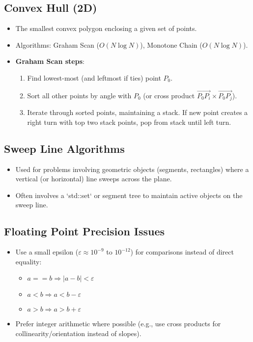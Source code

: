 \subsection*{Convex Hull (2D)}
\begin{itemize}
    \item The smallest convex polygon enclosing a given set of points.
    \item Algorithms: Graham Scan ($O(N \log N)$), Monotone Chain ($O(N \log N)$).
    \item \textbf{Graham Scan steps}:
        \begin{enumerate}
            \item Find lowest-most (and leftmost if ties) point $P_0$.
            \item Sort all other points by angle with $P_0$ (or cross product $\vec{P_0P_i} \times \vec{P_0P_j}$).
            \item Iterate through sorted points, maintaining a stack. If new point creates a right turn with top two stack points, pop from stack until left turn.
        \end{enumerate}
\end{itemize}

\subsection*{Sweep Line Algorithms}
\begin{itemize}
    \item Used for problems involving geometric objects (segments, rectangles) where a vertical (or horizontal) line sweeps across the plane.
    \item Often involves a `std::set` or segment tree to maintain active objects on the sweep line.
\end{itemize}

\subsection*{Floating Point Precision Issues}
\begin{itemize}
    \item Use a small epsilon ($\varepsilon \approx 10^{-9}$ to $10^{-12}$) for comparisons instead of direct equality:
        \begin{itemize}
            \item $a == b \Rightarrow |a-b| < \varepsilon$
            \item $a < b \Rightarrow a < b - \varepsilon$
            \item $a > b \Rightarrow a > b + \varepsilon$
        \end{itemize}
    \item Prefer integer arithmetic where possible (e.g., use cross products for collinearity/orientation instead of slopes).
\end{itemize}

